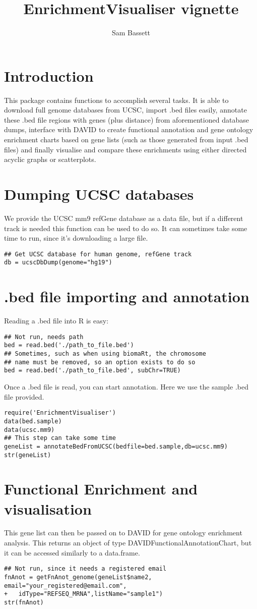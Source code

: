 \documentclass[11pt, oneside]{article}
\title{EnrichmentVisualiser vignette}
\author{Sam Bassett}
\affil{Developmental and Stem Cell Biology Lab,\\Victor Chang Cardiac Research Institute,\\Darlinghurst, Sydney, Australia}
\date{}
\begin{document}
\maketitle
\section{Introduction}
This package contains functions to accomplish several tasks. It is able to download full genome databases from UCSC, import .bed files easily, annotate these .bed file regions with genes (plus distance) from aforementioned database dumps, interface with DAVID to create functional annotation and gene ontology enrichment charts based on gene lists (such as those generated from input .bed files) and finally visualise and compare these enrichments using either directed acyclic graphs or scatterplots.

\section{Dumping UCSC databases}
We provide the UCSC mm9 refGene database as a data file, but if a different track is needed this function can be used to do so. It can sometimes take some time to run, since it's downloading a large file.
\begin{verbatim}
## Get UCSC database for human genome, refGene track
db = ucscDbDump(genome="hg19")
\end{verbatim}

\section{.bed file importing and annotation}
Reading a .bed file into R is easy: \begin{verbatim}
## Not run, needs path
bed = read.bed('./path_to_file.bed')
## Sometimes, such as when using biomaRt, the chromosome
## name must be removed, so an option exists to do so
bed = read.bed('./path_to_file.bed', subChr=TRUE)
\end{verbatim}
Once a .bed file is read, you can start annotation. Here we use the sample .bed file provided.
\begin{verbatim}
require('EnrichmentVisualiser')
data(bed.sample)
data(ucsc.mm9)
## This step can take some time
geneList = annotateBedFromUCSC(bedfile=bed.sample,db=ucsc.mm9)
str(geneList)
\end{verbatim}

\section{Functional Enrichment and visualisation}
This gene list can then be passed on to DAVID for gene ontology enrichment analysis. This returns an object of type DAVIDFunctionalAnnotationChart, but it can be accessed similarly to a data.frame.
\begin{verbatim}
## Not run, since it needs a registered email
fnAnot = getFnAnot_genome(geneList$name2, email="your_registered@email.com",
+	idType="REFSEQ_MRNA",listName="sample1")
str(fnAnot)
\end{verbatim}
\end{document}
